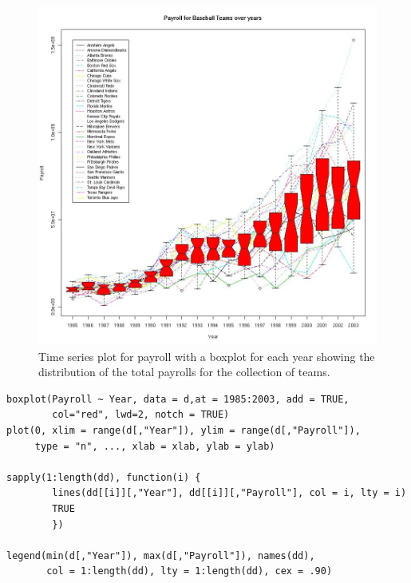 \begin{center}
\begin{figure} 
 \includegraphics[width=5.5in]{RDBMS/images/PayrollYear.jpg}
 \caption{Time series plot for payroll with a boxplot for each year showing the distribution of the total payrolls for the collection of teams.}
\label{fig:payrollYear}
\end{figure} 
\end{center}

\begin{verbatim}
boxplot(Payroll ~ Year, data = d,at = 1985:2003, add = TRUE, 
        col="red", lwd=2, notch = TRUE)
plot(0, xlim = range(d[,"Year"]), ylim = range(d[,"Payroll"]), 
     type = "n", ..., xlab = xlab, ylab = ylab)

sapply(1:length(dd), function(i) {
        lines(dd[[i]][,"Year"], dd[[i]][,"Payroll"], col = i, lty = i)
        TRUE
        })

legend(min(d[,"Year"]), max(d[,"Payroll"]), names(dd), 
       col = 1:length(dd), lty = 1:length(dd), cex = .90)
\end{verbatim}

